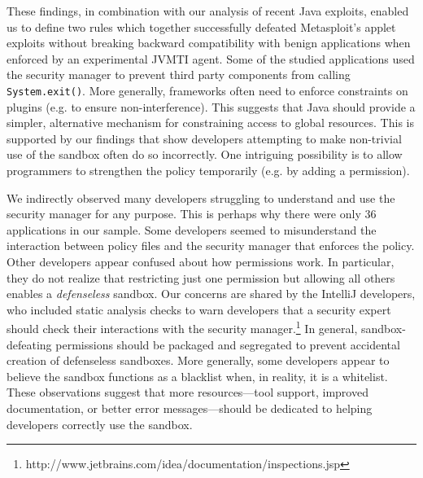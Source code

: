 \documentclass{sig-alternate}
\begin{document}
These findings, in combination with our analysis of recent Java exploits,
enabled us to define two rules which together successfully
defeated Metasploit's applet exploits without breaking backward compatibility with benign applications when enforced by an experimental JVMTI agent. Some of the studied applications
used the security manager to prevent third party components from calling
\texttt{System.exit()}. More generally, frameworks often need to enforce
constraints on plugins (e.g. to ensure non-interference). This suggests
that Java should provide a simpler, alternative mechanism for constraining
access to global resources. This is supported by our findings that
show developers attempting to make non-trivial use of the sandbox
often do so incorrectly. One intriguing possibility is to allow programmers
to strengthen the policy temporarily (e.g. by adding a permission). 

We indirectly observed many developers struggling to understand and
use the security manager for any purpose. This is perhaps why there
were only 36 applications in our sample. Some developers seemed to
misunderstand the interaction between policy files and the security
manager that enforces the policy. Other developers appear confused
about how permissions work. In particular, they do not realize that
restricting just one permission but allowing all others enables a
\emph{defenseless} sandbox. Our concerns are shared by the IntelliJ developers, who included static analysis checks to warn developers that a security expert should check their interactions with the security manager.\footnote{http://www.jetbrains.com/idea/documentation/inspections.jsp%
} In general, sandbox-defeating permissions
should be packaged and segregated to prevent accidental creation of
defenseless sandboxes. More generally, some developers appear to believe
the sandbox functions as a blacklist when, in reality, it is a whitelist.
These observations suggest that more resources---tool support, improved
documentation, or better error messages---should be dedicated to helping
developers correctly use the sandbox. 



\end{document}
